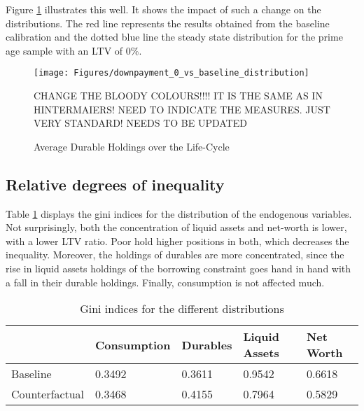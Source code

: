 \documentclass[12pt,a4paper,leqno]{article}
\theoremstyle{definition}
\begin{document}
Figure \ref{downpayment_vs_baseline} illustrates this well. It shows the impact of such a change on the distributions. The red line represents the results obtained from the baseline calibration and the dotted blue line the steady state distribution for the prime age sample with an LTV of 0\%. 

\begin{figure}[!htbp]
\caption{Average Durable Holdings over the Life-Cycle} 
\label{downpayment_vs_baseline}	%
\centering
\texttt{[image: Figures/downpayment\_0\_vs\_baseline\_distribution]}  %

\begin{minipage}{0.8\linewidth}
\footnotesize{CHANGE THE BLOODY COLOURS!!!! IT IS THE SAME AS IN HINTERMAIERS! NEED TO INDICATE THE MEASURES. JUST VERY STANDARD! NEEDS TO BE UPDATED}
\end{minipage}

\end{figure}

\subsection{Relative degrees of inequality}
Table \ref{Gini_Ranking_counter_factual} displays the gini indices for the distribution of the endogenous variables. Not surprisingly, both the concentration of liquid assets and net-worth is lower, with a lower LTV ratio. Poor hold higher positions in both, which decreases the inequality. Moreover, the holdings of durables are more concentrated, since the rise in liquid assets holdings of the borrowing constraint goes hand in hand with a fall in their durable holdings. Finally, consumption is not affected much. 

\begin{table}[!htbp]
\centering
\caption{Gini indices for the different distributions}
\label{Gini_Ranking_counter_factual}
\begin{tabular}{@{}lllll@{}}
\toprule
      & Consumption & Durables & Liquid Assets & Net Worth \\ \midrule
Baseline & 0.3492       & 0.3611   & 0.9542        & 0.6618    \\ \midrule
Counterfactual  & 0.3468         & 0.4155     & 0.7964          & 0.5829      \\ \bottomrule
\end{tabular}
\end{table}
\end{document}
